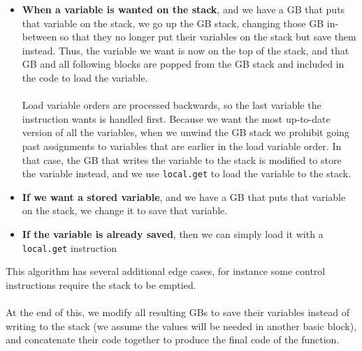 \documentclass[12pt,twoside,notitlepage]{report}
\newcommand{\wainline}{\texttt}
\newcommand{\cfbox}[2]{%
	\colorlet{currentcolor}{.}%
	{\color{#1}%
		\fbox{\color{currentcolor}#2}}%
}
\newcommand\note[1]{\noindent\cfbox{blue}{\parbox{\textwidth}{\textcolor{blue}{#1}}}}
\begin{document}
\begin{itemize}
	\item \textbf{When a variable is wanted on the stack}, and we have a GB that puts that variable on the stack, we go up the GB stack, changing those GB in-between so that they no longer put their variables on the stack but save them instead. Thus, the variable we want is now on the top of the stack, and that GB and all following blocks are popped from the GB stack and included in the code to load the variable.
	\\\\
	Load variable orders are processed backwards, so the last variable the instruction wants is handled first. Because we want the most up-to-date version of all the variables, when we unwind the GB stack we prohibit going past assignments to variables that are earlier in the load variable order. In that case, the GB that writes the variable to the stack is modified to store the variable instead, and we use \wainline{local.get} to load the variable to the stack.
	\item \textbf{If we want a stored variable}, and we have a GB that puts that variable on the stack, we change it to save that variable.
	\item \textbf{If the variable is already saved}, then we can simply load it with a \wainline{local.get} instruction
\end{itemize}
This algorithm has several additional edge cases, for instance some control instructions require the stack to be emptied.
\\\\
At the end of this, we modify all resulting GBs to save their variables instead of writing to the stack (we assume the values will be needed in another basic block), and concatenate their code together to produce the final code of the function.
\note{Needs to be explained better. What's the problem and what is being solved. Mention the huge line count and obvious fixes from non-SCG code.}
\end{document}
